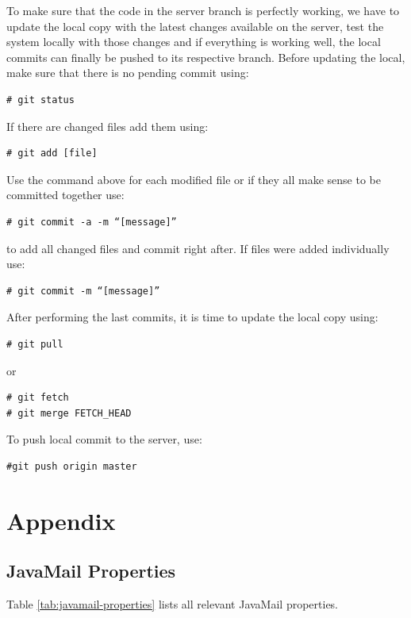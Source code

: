 \documentclass[envcountsame,envcountchap]{svmono}
\begin{document}
To make sure that the code in the server branch is perfectly working, we have to update the local copy with the latest changes available on the server, test the system locally with those changes and if everything is working well, the local commits can finally be pushed to its respective branch. Before updating the local, make sure that there is no pending commit using:
\begin{verbatim}
# git status
\end{verbatim}
If there are changed files add them using:
\begin{verbatim}
# git add [file]
\end{verbatim}
Use the command above for each modified file or if they all make sense to be committed together use:
\begin{verbatim}
# git commit -a -m “[message]”
\end{verbatim}
to add all changed files and commit right after. If files were added individually use:
\begin{verbatim}
# git commit -m “[message]”
\end{verbatim}
After performing the last commits, it is time to update the local copy using:
\begin{verbatim}
# git pull
\end{verbatim}
or
\begin{verbatim}
# git fetch
# git merge FETCH_HEAD
\end{verbatim}

To push local commit to the server, use:

\begin{verbatim}
#git push origin master
\end{verbatim}

\part*{Appendix}

\chapter*{JavaMail Properties}

Table \ref{tab:javamail-properties} lists all relevant JavaMail properties.
\end{document}
